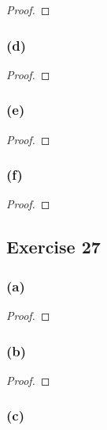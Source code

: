 \documentclass[14pt]{extarticle}
\begin{document}
\begin{proof}

\end{proof}

\subsubsection{(d)}

\begin{proof}

\end{proof}

\subsubsection{(e)}

\begin{proof}

\end{proof}

\subsubsection{(f)}

\begin{proof}

\end{proof}

\subsection{Exercise 27}

\subsubsection{(a)}

\begin{proof}

\end{proof}

\subsubsection{(b)}

\begin{proof}

\end{proof}

\subsubsection{(c)}
\end{document}
